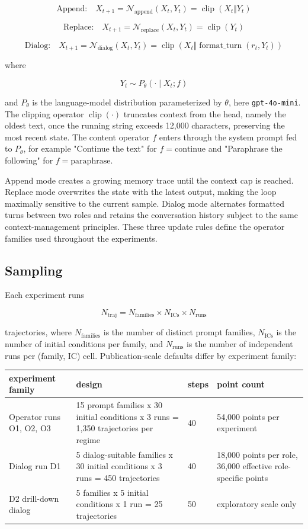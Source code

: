 \documentclass{article}
\theoremstyle{plain}
\theoremstyle{definition}
\begin{document}
\[\text{Append:}\quad X_{t+1}=\mathcal{N}_{\text{append}}(X_t,Y_t)=\operatorname{clip}(X_t\Vert Y_t)\]

\[\text{Replace:}\quad X_{t+1}=\mathcal{N}_{\text{replace}}(X_t,Y_t)=\operatorname{clip}(Y_t)\]

\[\text{Dialog:}\quad X_{t+1}=\mathcal{N}_{\text{dialog}}(X_t,Y_t)=\operatorname{clip}\!\left(X_t\Vert \operatorname{format\_turn}(r_t,Y_t)\right)\]

where

\[Y_t \sim P_\theta(\cdot \mid X_t; f)\]

and \(P_\theta\) is the language-model distribution parameterized by \(\theta\), here \texttt{gpt-4o-mini}. The clipping operator \(\operatorname{clip}(\cdot)\) truncates context from the head, namely the oldest text, once the running string exceeds 12,000 characters, preserving the most recent state. The content operator \(f\) enters through the system prompt fed to \(P_\theta\), for example "Continue the text" for \(f=\text{continue}\) and "Paraphrase the following" for \(f=\text{paraphrase}\).

Append mode creates a growing memory trace until the context cap is reached. Replace mode overwrites the state with the latest output, making the loop maximally sensitive to the current sample. Dialog mode alternates formatted turns between two roles and retains the conversation history subject to the same context-management principles. These three update rules define the operator families used throughout the experiments.

\subsection{Sampling}

Each experiment runs

\[N_{\text{traj}}=N_{\text{families}}\times N_{\text{ICs}}\times N_{\text{runs}}\]

trajectories, where \(N_{\text{families}}\) is the number of distinct prompt families, \(N_{\text{ICs}}\) is the number of initial conditions per family, and \(N_{\text{runs}}\) is the number of independent runs per (family, IC) cell. Publication-scale defaults differ by experiment family:

\begin{table}[h!]
\centering
\small
\begin{tabularx}{\textwidth}{lYYY}
\toprule
experiment family & design & steps & point count \\
\midrule
Operator runs O1, O2, O3 & 15 prompt families x 30 initial conditions x 3 runs = 1,350 trajectories per regime & 40 & 54,000 points per experiment \\
Dialog run D1 & 5 dialog-suitable families x 30 initial conditions x 3 runs = 450 trajectories & 40 & 18,000 points per role, 36,000 effective role-specific points \\
D2 drill-down dialog & 5 families x 5 initial conditions x 1 run = 25 trajectories & 50 & exploratory scale only \\
\bottomrule
\end{tabularx}
\end{table}
\end{document}
